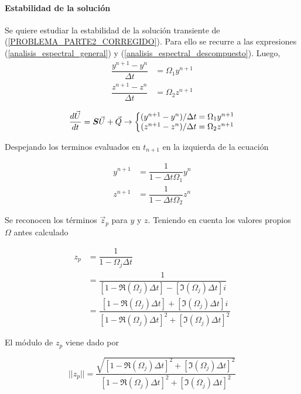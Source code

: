 \paragraph{Estabilidad de la solución}
Se quiere estudiar la estabilidad de la solución transiente de (\ref{PROBLEMA_PARTE2_CORREGIDO}). Para ello se recurre a las expresiones (\ref{analisis_espectral_general}) y (\ref{analisis_espectral_descompuesto}). Luego,
\begin{align}
\dfrac{ y^{n+1} - y^n } { \Delta t } & = \Omega_1 y^{n+1} \\
\dfrac{ z^{n+1} - z^n } { \Delta t } & = \Omega_2 z^{n+1}
\end{align} 

\begin{equation}
\dfrac{d \vec{U}}{d t} = \boldsymbol{S} \vec{U} + \vec{Q} \rightarrow \left\{ \begin{matrix}
( y^{n+1} - y^n ) /  \Delta t  = \Omega_1 y^{n+1} \\
( z^{n+1} - z^n ) /  \Delta t  = \Omega_2 z^{n+1}
\end{matrix} \right.
\end{equation}

Despejando los terminos evaluados en $t_{n+1}$ en la izquierda de la ecuación

\begin{align}
y^{n+1} &= \dfrac{ 1 }{ 1 - \Delta t \Omega_1 } y^n \\
z^{n+1} &= \dfrac{ 1 }{ 1 - \Delta t \Omega_2 } z^n
\end{align}

Se reconocen los términos $\vec{z}_p$ para $y$ y $z$. Teniendo en cuenta los valores propios $\Omega$ antes calculado

\begin{align}
z_p &= \dfrac{1}{1-\Omega_j \Delta t} \\
&= \dfrac{1}{ \left[ 1-\Re(\Omega_j) \Delta t \right] - \left[ \Im(\Omega_j) \Delta t \right] i }\\
&= \dfrac{\left[ 1- \Re(\Omega_j) \Delta t \right] + \left[ \Im(\Omega_j) \Delta t \right] i }{ \left[ 1-\Re(\Omega_j) \Delta t \right]^2 + \left[ \Im(\Omega_j) \Delta t \right]^2}
\end{align}

El módulo de $z_p$ viene dado por

\begin{equation}
||z_p|| = \dfrac{ \sqrt{ \left[ 1-\Re(\Omega_j) \Delta t \right]^2 + \left[ \Im(\Omega_j) \Delta t \right]^2 } } { \left[ 1- \Re(\Omega_j) \Delta t \right]^2 + \left[ \Im(\Omega_j) \Delta t \right]^2}
\end{equation}

